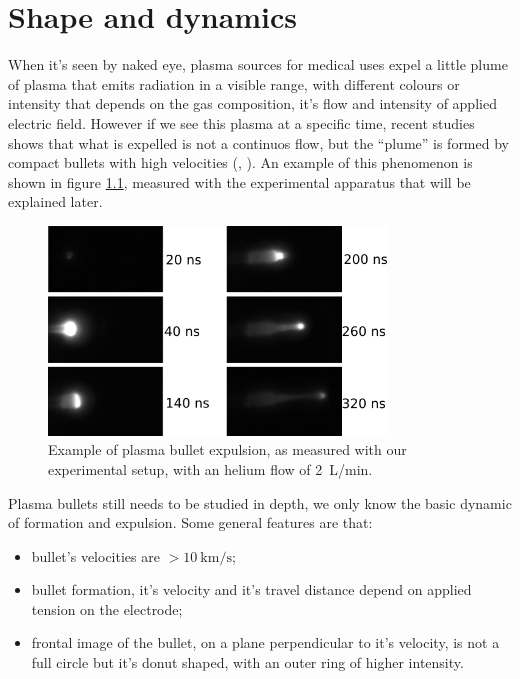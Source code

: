 \chapter{Shape and dynamics}
\label{ch:shape}
When it's seen by naked eye, plasma sources for medical uses expel a little plume of plasma that emits radiation in a visible range, with different colours or intensity that depends on the gas composition, it's flow and intensity of applied electric field. 
However if we see this plasma at a specific time, recent studies shows that what is expelled is not a continuos flow, but the ``plume'' is formed by compact bullets with high velocities (\cite{Mericam_Bourdet_2009}, \cite{doi:10.1002/ppap.200900078}).
An example of this phenomenon is shown in figure \ref{fig:pl_bullet}, measured with the experimental apparatus that will be explained later.
\begin{figure}
 \centering
 \includegraphics[width=0.8\textwidth]{Images/Shape/frames.png}
 \caption{Example of plasma bullet expulsion, as measured with our experimental setup, with an helium flow of \SI{2}{\liter/\minute}.}
 \label{fig:pl_bullet}
\end{figure}

Plasma bullets still needs to be studied in depth, we only know the basic dynamic of formation and expulsion. Some general features are that:
\begin{itemize}
 \item bullet's velocities are $> \SI{10}{\kilo\meter/\second}$;
 \item bullet formation, it's velocity and it's travel distance depend on applied tension on the electrode;
 \item frontal image of the bullet, on a plane perpendicular to it's velocity, is not a full circle but it's donut shaped, with an outer ring of higher intensity.
\end{itemize}

